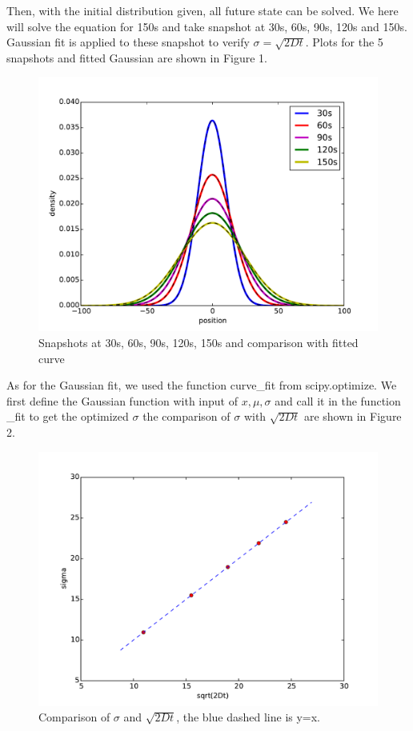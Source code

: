 \documentclass{article}
\begin{document}
Then, with the initial distribution given, all future state can be solved. We here will solve the equation for 150s and take snapshot at 30s, 60s, 90s, 120s and 150s. Gaussian fit is applied to these snapshot to verify $\sigma=\sqrt{2Dt}$. Plots for the 5 snapshots and fitted Gaussian are shown in Figure 1.
\begin{figure}
\centering
\includegraphics[scale=0.85]{diffusion.pdf}
\caption{Snapshots at 30s, 60s, 90s, 120s, 150s and comparison with fitted curve}
\end{figure}

As for the Gaussian fit, we used the function curve\_fit from scipy.optimize. We first define the Gaussian function with input of $x, \mu, \sigma$ and call it in the function \_fit to get the optimized $\sigma$ the comparison of $\sigma$ with $\sqrt{2Dt}$ are shown in Figure 2.
\begin{figure}
\centering
\includegraphics[scale=0.75]{sigma.pdf}
\caption{Comparison of $\sigma$ and $\sqrt{2Dt}$, the blue dashed line is y=x.}
\end{figure}
\end{document}
